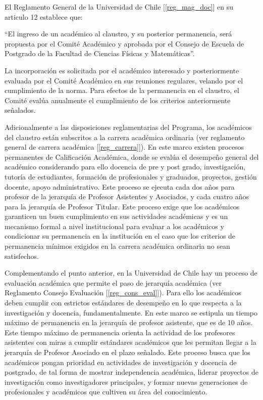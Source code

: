 El Reglamento General de la Universidad de Chile [\ref{reg_mag_doc}] en su articulo 12 establece que:

``El ingreso de un académico al claustro, y su posterior permanencia, será propuesta por el Comité
Académico y aprobada por el Consejo de Escuela de Postgrado de la Facultad de Ciencias Físicas
y Matemáticas''.

La incorporación es solicitada por el académico interesado y posteriormente evaluada por el
Comité Académico en sus reuniones regulares, velando por el cumplimiento de la norma. Para
efectos de la permanencia en el claustro, el Comité evalúa anualmente el cumplimiento de los
criterios anteriormente señalados.

Adicionalmente a las disposiciones reglamentarias del Programa, los académicos del claustro
están subscritos a la carrera académica ordinaria (ver reglamento general de carrera académica
[\ref{reg_carrera}]). En este marco existen procesos permanentes de Calificación Académica, donde se
evalúa el desempeño general del académico considerando para ello docencia de pre y post grado,
investigación, tutoría de estudiantes, formación de profesionales y graduados, proyectos, gestión
docente, apoyo administrativo. Este proceso se ejecuta cada dos años para profesor de la jerarquía
de Profesor Asistentes y Asociados, y cada cuatro años para la jerarquía de Profesor Titular. Este
proceso exige que los académicos garanticen un buen cumplimiento en sus actividades académicas
y es un mecanismo formal a nivel institucional para evaluar a los académicos y condicionar su
permanencia en la institución en el caso que los criterios de permanencia mínimos exigidos en la
carrera académica ordinaria no sean satisfechos.

Complementando el punto anterior, en la Universidad de Chile hay un proceso de evaluación
académica que permite el paso de jerarquía académica (ver Reglamento Consejo Evaluación
[\ref{reg_cons_eval}]). Para ello los académicos deben cumplir con estrictos estándares de desempeño en lo
que respecta a la investigación y docencia, fundamentalmente. En este marco se estipula un tiempo
máximo de permanencia en la jerarquía de profesor asistente, que es de 10 años. Este tiempo
máximo de permanencia orienta la actividad de los profesores asistentes con miras a cumplir
estándares académicos que les permitan llegar a la jerarquía de Profesor Asociado en el plazo
señalado. Este proceso busca que los académicos pongan prioridad en actividades de investigación
y docencia de postgrado, de tal forma de mostrar independencia académica, liderar proyectos de
investigación como investigadores principales, y formar nuevas generaciones de profesionales y
académicos que cultiven su área del conocimiento.

